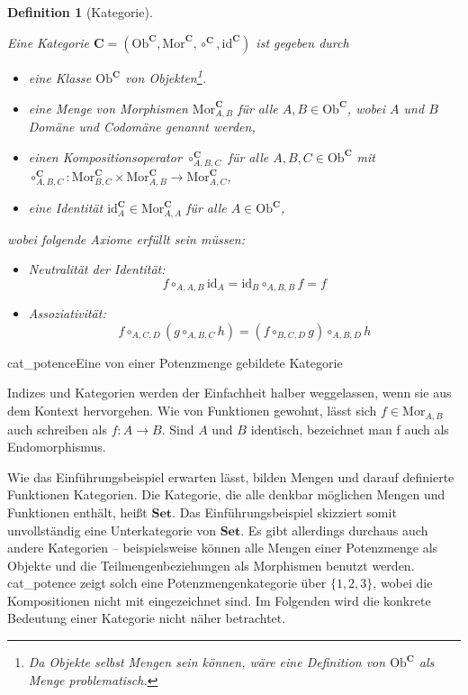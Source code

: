 \documentclass[12pt, a4paper, bibgerm]{scrbook}
\newcommand\abb{}
\newcommand\fig{}
\newcommand\ato{\rightarrow} %
\newtheorem{defini}{Definition}
\newcommand{\defi}[2]{%
  \begin{defini}[#1]
    \label{def:#1}
    #2
  \end{defini}
}
\begin{document}
\defi{Kategorie}{
Eine Kategorie $\mathbf{C} = (\mathrm{Ob}^\mathbf{C}, \mathrm{Mor}^\mathbf{C},
\circ^\mathbf{C}, \mathrm{id}^\mathbf{C})$ ist gegeben durch
\begin{itemize}
\item eine Klasse $\mathrm{Ob}^\mathbf{C}$ von Objekten\footnote{Da Objekte selbst Mengen
    sein können, wäre eine Definition von $\mathrm{Ob}^\mathbf{C}$ als Menge problematisch.}.
\item eine Menge von Morphismen $\mathrm{Mor}^\mathbf{C}_{A,B}$ für alle
  $ A,B \in \mathrm{Ob}^\mathbf{C}$, wobei $A$ und $B$ Domäne und
  Codomäne genannt werden,
\item einen Kompositionsoperator $\circ^\mathbf{C}_{A,B,C}$ für alle $
  A,B,C \in \mathrm{Ob}^\mathbf{C}$ mit \\
  $\circ^\mathbf{C}_{A,B,C} : \mathrm{Mor}^\mathbf{C}_{B,C} \times
  \mathrm{Mor}^\mathbf{C}_{A,B} \rightarrow \mathrm{Mor}^\mathbf{C}_{A,C}$,
\item eine Identität $\mathrm{id}^\mathbf{C}_A \in \mathrm{Mor}^\mathbf{C}_{A,A}$ für alle $ A \in \mathrm{Ob}^\mathbf{C}$,
\end{itemize}
wobei folgende Axiome erfüllt sein müssen:
\begin{itemize}
\item Neutralität der Identität: $$f \circ_{A,A,B} \mathrm{id}_A = \mathrm{id}_B \circ_{A,B,B} f = f$$
\item Assoziativität:
  $$f \circ_{A,C,D} (g \circ_{A,B,C} h) = (f \circ_{B,C,D} g) \circ_{A,B,D}h$$
\end{itemize}
}

\fig{cat_potence}{Eine von einer Potenzmenge gebildete Kategorie}

Indizes und Kategorien werden der Einfachheit halber weggelassen, wenn
sie aus dem Kontext hervorgehen. Wie von Funktionen gewohnt, lässt sich
$f \in \mathrm{Mor}_{A,B}$ auch schreiben als $f : A \ato B$. Sind $A$
und $B$ identisch, bezeichnet man f auch als Endomorphismus.

Wie das Einführungsbeispiel erwarten lässt, bilden Mengen und darauf
definierte Funktionen Kategorien. Die Kategorie, die alle denkbar
möglichen Mengen und Funktionen enthält, heißt $\mathbf{Set}$. Das
Einführungsbeispiel skizziert somit unvollständig eine Unterkategorie
von $\mathbf{Set}$. Es gibt allerdings durchaus auch andere Kategorien --
beispielsweise können alle Mengen einer Potenzmenge als Objekte und die
Teilmengenbeziehungen als Morphismen benutzt werden. \abb{cat_potence}
zeigt solch eine Potenzmengenkategorie über $\{1,2,3\}$, wobei die
Kompositionen nicht mit eingezeichnet sind. Im Folgenden wird die
konkrete Bedeutung einer Kategorie nicht näher betrachtet.
\end{document}
